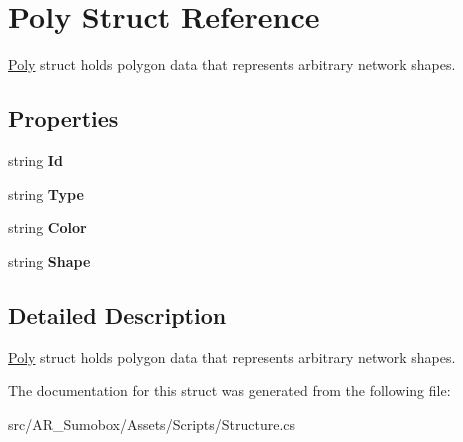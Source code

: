 \hypertarget{struct_poly}{}\section{Poly Struct Reference}
\label{struct_poly}


\mbox{\hyperlink{struct_poly}{Poly}} struct holds polygon data that represents arbitrary network shapes.  


\subsection*{Properties}
\begin{DoxyCompactItemize}
\item 
\mbox{\label{struct_poly_a09c8abd39a08fde749f6fd274ecaf8b4}} 
string {\bfseries Id}
\item 
\mbox{\label{struct_poly_a287ce0d3159149957debdf570ee58f8c}} 
string {\bfseries Type}
\item 
\mbox{\label{struct_poly_a405ea9c676cb3b5b128ad5da14cdebb9}} 
string {\bfseries Color}
\item 
\mbox{\label{struct_poly_a592622ff86e90d1f6b8c9f99595aaead}} 
string {\bfseries Shape}
\end{DoxyCompactItemize}


\subsection{Detailed Description}
\mbox{\hyperlink{struct_poly}{Poly}} struct holds polygon data that represents arbitrary network shapes. 



The documentation for this struct was generated from the following file\+:\begin{DoxyCompactItemize}
\item 
src/\+A\+R\+\_\+\+Sumobox/\+Assets/\+Scripts/Structure.\+cs\end{DoxyCompactItemize}
